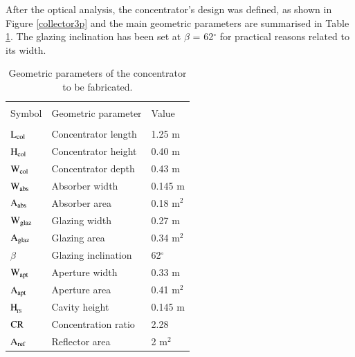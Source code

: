 After the optical analysis, the concentrator's design was defined, as shown in Figure \ref{collector3p} and the main geometric parameters are summarised in Table \ref{optics_parameters}. The glazing inclination has been set at $\beta$ = 62$^{\circ}$ for practical reasons related to its width. 


\begin{table}[!ht]
	\caption{Geometric parameters of the concentrator to be fabricated.}
	\centering
	\begin{tabular}{p{1.75cm}p{4.5cm}p{2.0cm}}
		\hline \\[-10pt]
		Symbol & Geometric parameter & Value \\ [2pt]
		\hline \\[-12pt]
		$\rm{L_{col}}$ & Concentrator length & 1.25 m \\ [2pt]
		
		$\rm{H_{col}}$ & Concentrator height & 0.40 m \\ [2pt]
		
		$\rm{W_{col}}$ & Concentrator depth & 0.43 m \\ [2pt]
		
		$\rm{W_{abs}}$ & Absorber width & 0.145 m \\ [2pt]
		
		$\rm{A_{abs}}$ & Absorber area & 0.18 m$^2$ \\ [2pt]
		
		$\rm{W_{glaz}}$ & Glazing width & 0.27 m \\ [2pt]
		
		$\rm{A_{glaz}}$ & Glazing area & 0.34 m$^2$ \\ [2pt]
		
		$\beta$ & Glazing inclination & 62$^{\circ}$ \\ [2pt]
		
		$\rm{W_{apt}}$ & Aperture width & 0.33 m \\ [2pt]
		
		$\rm{A_{apt}}$ & Aperture area & 0.41 m$^2$ \\ [2pt]
		
		$\rm{H_{\!_{TS}}}$ & Cavity height & 0.145 m \\ [2pt]
		
		$\rm{CR}$ & Concentration ratio & 2.28 \\ [2pt]
		
		$\rm{A_{ref}}$ & Reflector area & 2 m$^2$ \\
		
		\hline 
	\end{tabular}
	\label{optics_parameters}
\end{table}

